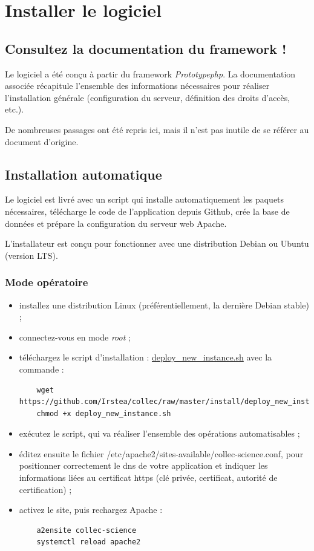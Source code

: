 \chapter{Installer le logiciel}

\section{Consultez la documentation du framework !}

Le logiciel a été conçu à partir du framework \textit{Prototypephp}. La documentation associée \cite{pphp-doc} récapitule l'ensemble des informations nécessaires pour réaliser l'installation générale (configuration du serveur, définition des droits d'accès, etc.).

De nombreuses passages ont été repris ici, mais il n'est pas inutile de se référer au document d'origine. 

\section{Installation automatique}
Le logiciel est livré avec un script qui installe automatiquement les paquets nécessaires, télécharge le code de l'application depuis Github, crée la base de données et prépare la configuration du serveur web Apache.

L'installateur est conçu pour fonctionner avec une distribution Debian ou Ubuntu (version LTS).

\subsection{Mode opératoire}
\begin{itemize}
	\item installez une distribution Linux (préférentiellement, la dernière Debian stable) ;
	\item connectez-vous en mode \textit{root} ;
	\item téléchargez le script d'installation : \href{https://github.com/Irstea/collec/raw/master/install/deploy_new_instance.sh}{deploy\_new\_instance.sh} avec la commande :
	\begin{lstlisting}
	wget https://github.com/Irstea/collec/raw/master/install/deploy_new_instance.sh
	chmod +x deploy_new_instance.sh
	\end{lstlisting}
	\item exécutez le script, qui va réaliser l'ensemble des opérations automatisables ;
	\item éditez ensuite le fichier /etc/apache2/sites-available/collec-science.conf, pour positionner correctement le dns de votre application et indiquer les informations liées au certificat https (clé privée, certificat, autorité de certification) ;
	\item activez le site, puis rechargez Apache :
	\begin{lstlisting}
	a2ensite collec-science
	systemctl reload apache2
	\end{lstlisting}
\end{itemize}


